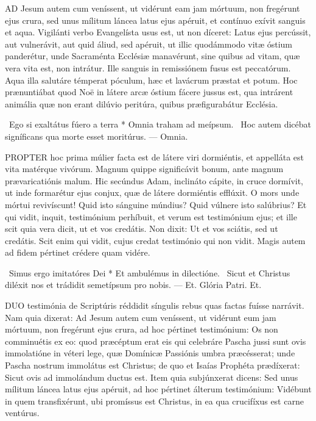 

\lettrine[lines=2]{A}{D} Jesum autem cum veníssent, ut vidérunt eam jam mórtuum, non fregérunt ejus crura, sed unus mílitum láncea latus ejus apéruit, et contínuo exívit sanguis et aqua. Vigilánti verbo Evangelísta usus est, ut non díceret: Latus ejus percússit, aut vulnerávit, aut quid áliud, sed apéruit, ut illic quodámmodo vitæ óstium panderétur, unde Sacraménta Ecclésiæ manavérunt, sine quibus ad vitam, quæ vera vita est, non intrátur. Ille sanguis in remissiónem fusus est peccatórum. Aqua illa salutáre témperat póculum, hæc et lavácrum præstat et potum. Hoc prænuntiábat quod Noë in látere arcæ óstium fácere jussus est, qua intrárent animália quæ non erant dilúvio peritúra, quibus præfigurabátur Ecclésia.

\R\ Ego si exaltátus fúero a terra * Omnia traham ad meípsum. \V\ Hoc autem dicébat signíficans qua morte esset moritúrus. --- Omnia.


\lettrine[lines=2]{P}{ROPTER} hoc prima múlier facta est de látere viri dormiéntis, et appelláta est vita matérque vivórum. Magnum quippe significávit bonum, ante magnum prævaricatiónis malum. Hic secúndus Adam, inclináto cápite, in cruce dormívit, ut inde formarétur ejus conjux, quæ de látere dormiéntis efflúxit. O mors unde mórtui revivíscunt! Quid isto sánguine múndius? Quid vúlnere isto salúbrius? Et qui vidit, inquit, testimónium perhíbuit, et verum est testimónium ejus; et ille scit quia vera dicit, ut et vos credátis. Non dixit: Ut et vos sciátis, sed ut credátis. Scit enim qui vidit, cujus credat testimónio qui non vidit. Magis autem ad fidem pértinet crédere quam vidére.

\R\ Simus ergo imitatóres Dei * Et ambulémus in dilectióne. \V\ Sicut et Christus diléxit nos et trádidit semetípsum pro nobis. --- Et. Glória Patri. Et.


\lettrine[lines=2]{D}{UO} testimónia de Scriptúris réddidit síngulis rebus quas factas fuísse narrávit. Nam quia dixerat: Ad Jesum autem cum veníssent, ut vidérunt eum jam mórtuum, non fregérunt ejus crura, ad hoc pértinet testimónium: Os non comminuétis ex eo: quod præcéptum erat eis qui celebráre Pascha jussi sunt ovis immolatióne in véteri lege, quæ Domínicæ Passiónis umbra præcésserat; unde Pascha nostrum immolátus est Christus; de quo et Isaías Prophéta prædíxerat: Sicut ovis ad immolándum ductus est. Item quia subjúnxerat dicens: Sed unus mílitum láncea latus ejus apéruit, ad hoc pértinet álterum testimónium: Vidébunt in quem transfixérunt, ubi promíssus est Christus, in ea qua crucifíxus est carne ventúrus.


